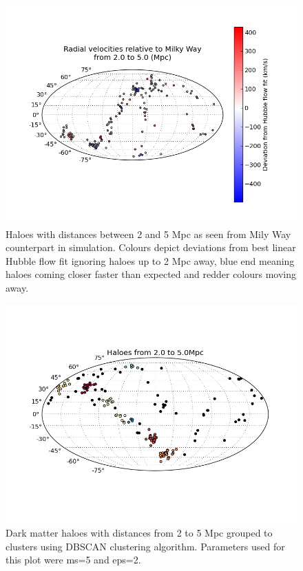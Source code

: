 \documentclass[english, oneside]{HYgradu}
\begin{document}
\begin{figure}
   \centering
   \includegraphics[width=\textwidth]{kuvat/anisotropy-aligned.png}
   \caption{Haloes with distances between 2 and 5 Mpc as seen from Mily Way counterpart in simulation. Colours depict deviations from best linear Hubble flow fit ignoring haloes up to 2 Mpc away, blue end meaning haloes coming closer faster than expected and redder colours moving away.}\label{fig:anisotropymap}
\end{figure}

\begin{figure}
   \centering
   \includegraphics[width=\textwidth]{kuvat/clustering-ms5eps2.png}
   \caption{Dark matter haloes with distances from 2 to 5 Mpc grouped to clusters using DBSCAN clustering algorithm. Parameters used for this plot were ms=5 and eps=2.}\label{fig:clustering}
\end{figure}
\end{document}
